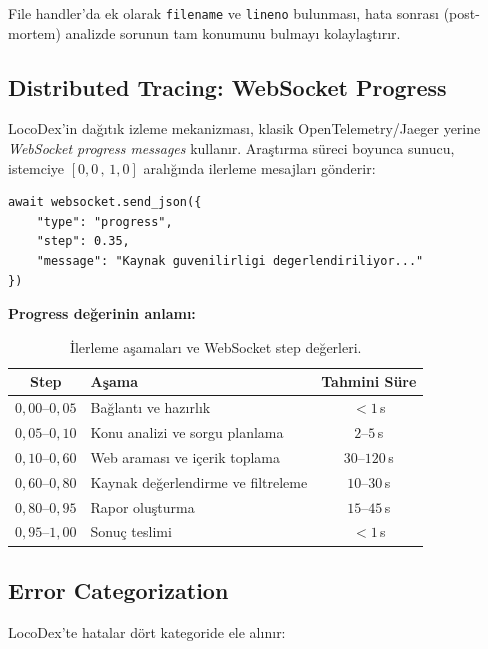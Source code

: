 \noindent File handler'da ek olarak \texttt{filename} ve \texttt{lineno} bulunmas{\i}, hata sonras{\i} (post-mortem) analizde sorunun tam konumunu bulmay{\i} kolayla\c{s}t{\i}r{\i}r.

\subsection{Distributed Tracing: WebSocket Progress}

LocoDex'in da\u{g}{\i}t{\i}k izleme mekanizmas{\i}, klasik OpenTelemetry/Jaeger yerine \emph{WebSocket progress messages} kullan{\i}r. Ara\c{s}t{\i}rma s\"{u}reci boyunca sunucu, istemciye $[0{,}0 \,,\, 1{,}0]$ aral{\i}\u{g}{\i}nda ilerleme mesajlar{\i} g\"{o}nderir:

\begin{verbatim}
await websocket.send_json({
    "type": "progress",
    "step": 0.35,
    "message": "Kaynak guvenilirligi degerlendiriliyor..."
})
\end{verbatim}

\textbf{Progress de\u{g}erinin anlam{\i}:}

\begin{table}[H]
\centering
\caption{\.{I}lerleme a\c{s}amalar{\i} ve WebSocket step de\u{g}erleri.}
\label{tab:progress-steps}
\begin{tabular}{clc}
\toprule
\textbf{Step} & \textbf{A\c{s}ama} & \textbf{Tahmini S\"{u}re} \\
\midrule
$0{,}00$--$0{,}05$ & Ba\u{g}lant{\i} ve haz{\i}rl{\i}k & $< 1$\,s \\
$0{,}05$--$0{,}10$ & Konu analizi ve sorgu planlama & $2$--$5$\,s \\
$0{,}10$--$0{,}60$ & Web aramas{\i} ve i\c{c}erik toplama & $30$--$120$\,s \\
$0{,}60$--$0{,}80$ & Kaynak de\u{g}erlendirme ve filtreleme & $10$--$30$\,s \\
$0{,}80$--$0{,}95$ & Rapor olu\c{s}turma & $15$--$45$\,s \\
$0{,}95$--$1{,}00$ & Sonu\c{c} teslimi & $< 1$\,s \\
\bottomrule
\end{tabular}
\end{table}

\subsection{Error Categorization}
\label{subsec:error-categories}

LocoDex'te hatalar d\"{o}rt kategoride ele al{\i}n{\i}r:


